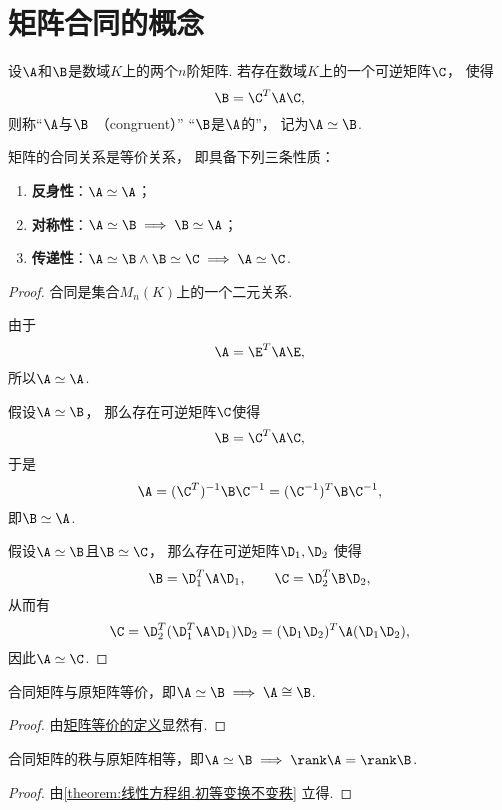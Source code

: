 \section{矩阵合同的概念}
\begin{definition}
设\(\A\)和\(\B\)是数域\(K\)上的两个\(n\)阶矩阵.
若存在数域\(K\)上的一个可逆矩阵\(\C\)，
使得\[
	\B=\C^T\A\C,
\]
则称“\(\A\)与\(\B\)~（congruent）”
“\(\B\)是\(\A\)的”，
记为\(\A\simeq\B\).
\end{definition}

\begin{property}
矩阵的合同关系是等价关系，
即具备下列三条性质：\begin{enumerate}
	\item {\rm\bf 反身性}：\(\A\simeq\A\)；
	\item {\rm\bf 对称性}：\(\A\simeq\B \implies \B\simeq\A\)；
	\item {\rm\bf 传递性}：\(\A\simeq\B \land \B\simeq\C \implies \A\simeq\C\).
\end{enumerate}
\begin{proof}
合同是集合\(M_n(K)\)上的一个二元关系.

由于\[
	\A = \E^T \A \E,
\]
所以\(\A \simeq \A\).

假设\(\A \simeq \B\)，
那么存在可逆矩阵\(\C\)使得\[
	\B=\C^T\A\C,
\]
于是\[
	\A=(\C^T)^{-1}\B\C^{-1}
	=(\C^{-1})^T\B\C^{-1},
\]
即\(\B \simeq \A\).

假设\(\A \simeq \B\)且\(\B \simeq \C\)，
那么存在可逆矩阵\(\D_1,\D_2\)
使得\[
	\B = \D_1^T \A \D_1, \qquad
	\C = \D_2^T \B \D_2,
\]
从而有\[
	\C = \D_2^T (\D_1^T \A \D_1) \D_2
	= (\D_1 \D_2)^T \A (\D_1 \D_2),
\]
因此\(\A \simeq \C\).
\end{proof}
\end{property}

\begin{property}
合同矩阵与原矩阵等价，即\(\A\simeq\B \implies \A\cong\B\).
\begin{proof}
由\hyperref[definition:逆矩阵.矩阵等价]{矩阵等价的定义}显然有.
\end{proof}
\end{property}

\begin{property}
合同矩阵的秩与原矩阵相等，即\(\A\simeq\B \implies \rank\A=\rank\B\).
\begin{proof}
由\cref{theorem:线性方程组.初等变换不变秩} 立得.
\end{proof}
\end{property}

